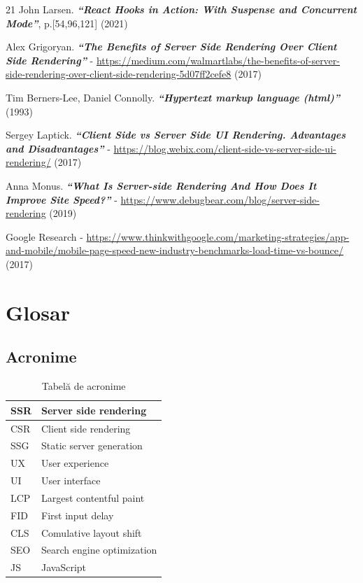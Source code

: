 \documentclass[12pt, a4paper]{report}
\begin{document}
\begin{thebibliography} {21}
	John Larsen. \textbf{\textit{“React Hooks in Action: With Suspense and Concurrent Mode”}}, p.[54,96,121] (2021)

	 Alex Grigoryan. \textbf{\textit{“The Benefits of Server Side Rendering Over Client Side Rendering”}} - \url{https://medium.com/walmartlabs/the-benefits-of-server-side-rendering-over-client-side-rendering-5d07ff2cefe8} (2017)

	 Tim Berners-Lee, Daniel Connolly. \textbf{\textit{“Hypertext markup language (html)”}} (1993)

	 Sergey Laptick. \textbf{\textit{“Client Side vs Server Side UI Rendering. Advantages and Disadvantages”}} -  \url{https://blog.webix.com/client-side-vs-server-side-ui-rendering/} (2017)

	 Anna Monus. \textbf{\textit{“What Is Server-side Rendering And How Does It Improve Site Speed?”}} -  \url{https://www.debugbear.com/blog/server-side-rendering} (2019)

	 Google Research - \url{https://www.thinkwithgoogle.com/marketing-strategies/app-and-mobile/mobile-page-speed-new-industry-benchmarks-load-time-vs-bounce/} (2017)


\end{thebibliography}


\appendix %

\chapter{Glosar}


\section{Acronime}

\begin{table} [H]
	\begin{tabular} {|  l | L{10cm} |}
		\hline
		SSR & Server side rendering      \\ [0.2ex]
		\hline
		CSR & Client side rendering      \\ [0.2ex]
		\hline
		SSG & Static server generation   \\ [0.2ex]
		\hline
		UX  & User experience            \\ [0.2ex]
		\hline
		UI  & User interface             \\ [0.2ex]
		\hline
		LCP & Largest contentful paint   \\ [0.2ex]
		\hline
		FID & First input delay          \\ [0.2ex]
		\hline
		CLS & Comulative layout shift    \\ [0.2ex]
		\hline
		SEO & Search engine optimization \\ [0.2ex]
		\hline
		JS  & JavaScript                 \\ [0.2ex]
		\hline
	\end{tabular}
	\caption{Tabel\u a de acronime}
	\label{table:acron}
\end{table}

\end{document}

